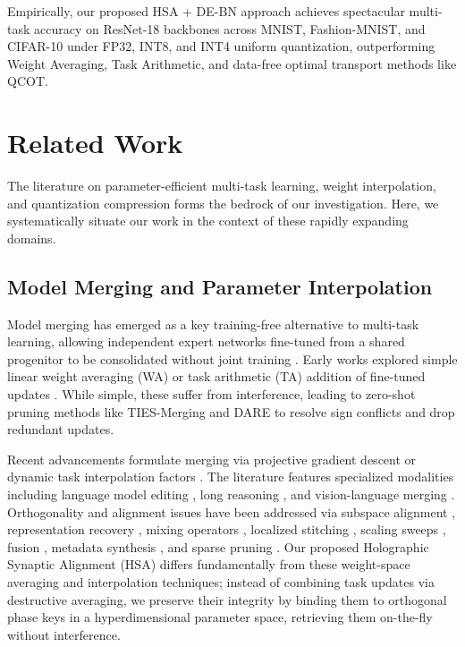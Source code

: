 \documentclass{article}
\theoremstyle{plain}
\theoremstyle{definition}
\theoremstyle{remark}
\begin{document}
Empirically, our proposed HSA + DE-BN approach achieves spectacular multi-task accuracy on ResNet-18 backbones across MNIST, Fashion-MNIST, and CIFAR-10 under FP32, INT8, and INT4 uniform quantization, outperforming Weight Averaging, Task Arithmetic, and data-free optimal transport methods like QCOT.

\section{Related Work}
\label{sec:related_work}

The literature on parameter-efficient multi-task learning, weight interpolation, and quantization compression forms the bedrock of our investigation. Here, we systematically situate our work in the context of these rapidly expanding domains.

\subsection{Model Merging and Parameter Interpolation}
Model merging has emerged as a key training-free alternative to multi-task learning, allowing independent expert networks fine-tuned from a shared progenitor to be consolidated without joint training \cite{wortsman2022model, ilharco2023editing}. Early works explored simple linear weight averaging (WA) or task arithmetic (TA) addition of fine-tuned updates \cite{ilharco2023editing, wortsman2022model, Marczak2025NoTL}. While simple, these suffer from interference, leading to zero-shot pruning methods like TIES-Merging \cite{yadav2023ties} and DARE \cite{yu2024dare} to resolve sign conflicts and drop redundant updates. 

Recent advancements formulate merging via projective gradient descent \cite{Wei2025ModelingMM} or dynamic task interpolation factors \cite{Yang2023AdaMergingAM, Du2025AdaMMSMM}. The literature features specialized modalities including language model editing \cite{Bhardwaj2024LanguageMA}, long reasoning \cite{Wu2025UnlockingEL}, and vision-language merging \cite{Sun2025TaskAI}. Orthogonality and alignment issues have been addressed via subspace alignment \cite{Marczak2025NoTL}, representation recovery \cite{Yuan2025SuperficialSR}, mixing operators \cite{Yang2025MixDO}, localized stitching \cite{He2024LocalizeandStitchEM, Dai2025LeveragingSL}, scaling sweeps \cite{Yoshida2025MasteringTA, Braga2025InvestigatingTA}, fusion \cite{Yang2024AdversarialES, Dansereau2023ModelST}, metadata synthesis \cite{Zhou2024MetaGPTML}, and sparse pruning \cite{Zimmer2023SparseMS}. Our proposed Holographic Synaptic Alignment (HSA) differs fundamentally from these weight-space averaging and interpolation techniques; instead of combining task updates via destructive averaging, we preserve their integrity by binding them to orthogonal phase keys in a hyperdimensional parameter space, retrieving them on-the-fly without interference.
\end{document}
